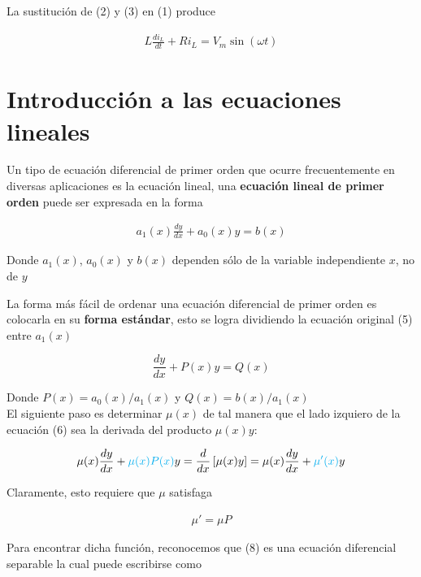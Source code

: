 \documentclass{article}
\begin{document}
\noindent La sustitución de (2) y (3) en (1) produce

\begin{align}
	L \frac{di_L}{dt} + Ri_L = V_m \sin (\omega t)
\end{align}

\section*{Introducción a las ecuaciones lineales}
Un tipo de ecuación diferencial de primer orden que ocurre frecuentemente en diversas aplicaciones es la ecuación lineal, una \textbf{ecuación lineal de primer orden} puede ser expresada en la forma

\begin{align}
	a_1(x) \frac{dy}{dx} + a_0(x)y = b(x)
\end{align}

\noindent Donde $a_1(x)$, $a_0(x)$ y $b(x)$ dependen sólo de la variable independiente $x$, no de $y$

\noindent La forma más fácil de ordenar una ecuación diferencial de primer orden es colocarla en su \textbf{forma estándar}, esto se logra dividiendo la ecuación original (5) entre $a_1(x)$

\begin{tcolorbox}[colback=red!5!white,colframe=red!75!black,arc=0mm,boxrule=0mm,width=(\linewidth+0.5cm)]
	\begin{equation}
		\frac{dy}{dx} + P(x)y = Q(x)
	\end{equation}
\end{tcolorbox}

\noindent Donde $P(x) = a_0(x)/a_1(x)$ y $Q(x) = b(x)/a_1(x)$ \\

\noindent El siguiente paso es determinar $\mu (x)$ de tal manera que el lado izquiero de la ecuación (6) sea la derivada del producto $\mu(x)y$:

\begin{align}
	\mu(x)\frac{dy}{dx} + \color{cyan} \mu(x)P(x) \color{black} y = \frac{d}{dx} \left[ \mu(x)y \right] = \mu(x) \frac{dy}{dx} + \color{cyan} \mu'(x) \color{black} y
\end{align}

\noindent Claramente, esto requiere que $\mu$ satisfaga

\begin{align}
	\mu' = \mu P
\end{align}

\noindent Para encontrar dicha función, reconocemos que (8) es una ecuación diferencial separable  la cual puede escribirse como
\end{document}
